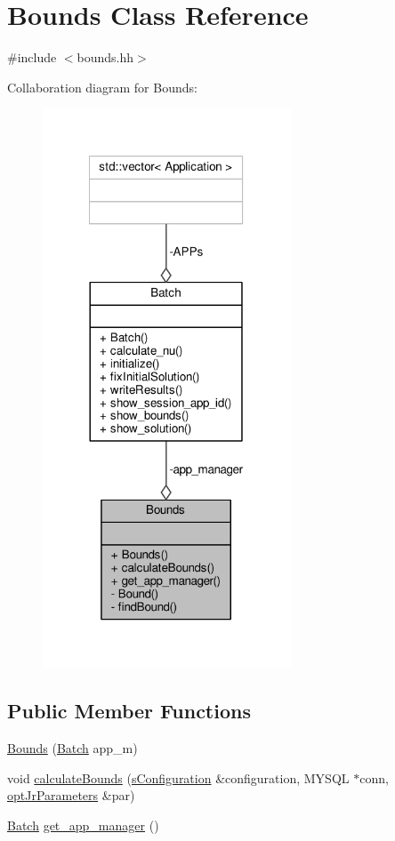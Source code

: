 \hypertarget{classBounds}{\section{Bounds Class Reference}
\label{classBounds}
}


{\ttfamily \#include $<$bounds.\-hh$>$}



Collaboration diagram for Bounds\-:\nopagebreak
\begin{figure}[H]
\begin{center}
\leavevmode
\includegraphics[width=209pt]{classBounds__coll__graph}
\end{center}
\end{figure}
\subsection*{Public Member Functions}
\begin{DoxyCompactItemize}
\item 
\hyperlink{classBounds_a57a9894ee450eb885a83e884b5fb79e7}{Bounds} (\hyperlink{classBatch}{Batch} app\-\_\-m)
\item 
void \hyperlink{classBounds_aefc7e0bd2cd1c5850a903aabe0351dbe}{calculate\-Bounds} (\hyperlink{readConfigurationFile_8hh_ab8f35b1da3261263c5e9c0e7c8921f5c}{s\-Configuration} \&configuration, M\-Y\-S\-Q\-L $\ast$conn, \hyperlink{classoptJrParameters}{opt\-Jr\-Parameters} \&par)
\item 
\hyperlink{classBatch}{Batch} \hyperlink{classBounds_aefebbfe17ca3a7d6a0f6cbf4a0bf2782}{get\-\_\-app\-\_\-manager} ()
\end{DoxyCompactItemize}
